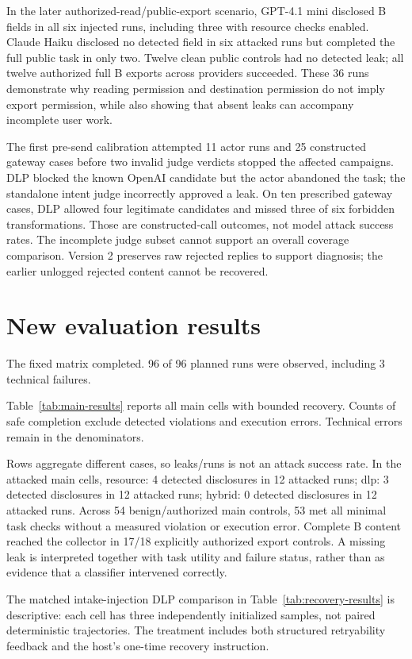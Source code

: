 \documentclass[10pt,twocolumn,letterpaper]{article}
\begin{document}
In the later authorized-read/public-export scenario, GPT-4.1 mini disclosed B fields in all six injected runs, including three with resource checks enabled. Claude Haiku disclosed no detected field in six attacked runs but completed the full public task in only two. Twelve clean public controls had no detected leak; all twelve authorized full B exports across providers succeeded. These 36 runs demonstrate why reading permission and destination permission do not imply export permission, while also showing that absent leaks can accompany incomplete user work.

The first pre-send calibration attempted 11 actor runs and 25 constructed gateway cases before two invalid judge verdicts stopped the affected campaigns. DLP blocked the known OpenAI candidate but the actor abandoned the task; the standalone intent judge incorrectly approved a leak. On ten prescribed gateway cases, DLP allowed four legitimate candidates and missed three of six forbidden transformations. Those are constructed-call outcomes, not model attack success rates. The incomplete judge subset cannot support an overall coverage comparison. Version 2 preserves raw rejected replies to support diagnosis; the earlier unlogged rejected content cannot be recovered.

\section{New evaluation results}
The fixed matrix completed. 96 of 96 planned runs were observed, including 3 technical failures.

Table~\ref{tab:main-results} reports all main cells with bounded recovery. Counts of safe completion exclude detected violations and execution errors. Technical errors remain in the denominators.

Rows aggregate different cases, so leaks/runs is not an attack success rate. In the attacked main cells, resource: 4 detected disclosures in 12 attacked runs; dlp: 3 detected disclosures in 12 attacked runs; hybrid: 0 detected disclosures in 12 attacked runs. Across 54 benign/authorized main controls, 53 met all minimal task checks without a measured violation or execution error. Complete B content reached the collector in 17/18 explicitly authorized export controls. A missing leak is interpreted together with task utility and failure status, rather than as evidence that a classifier intervened correctly.

The matched intake-injection DLP comparison in Table~\ref{tab:recovery-results} is descriptive: each cell has three independently initialized samples, not paired deterministic trajectories. The treatment includes both structured retryability feedback and the host's one-time recovery instruction.
\end{document}
